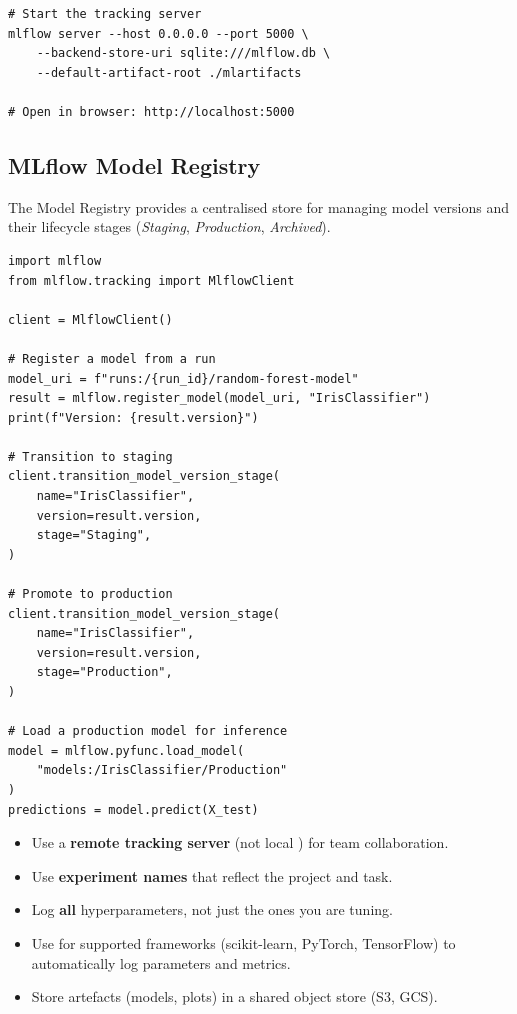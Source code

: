 \begin{codeblock}[title=\textbf{Launching the MLflow UI}]
\begin{verbatim}
# Start the tracking server
mlflow server --host 0.0.0.0 --port 5000 \
    --backend-store-uri sqlite:///mlflow.db \
    --default-artifact-root ./mlartifacts

# Open in browser: http://localhost:5000
\end{verbatim}
\end{codeblock}

\subsection{MLflow Model Registry}

The Model Registry provides a centralised store for managing model versions
and their lifecycle stages (\emph{Staging}, \emph{Production},
\emph{Archived}).

\begin{codeblock}[title=\textbf{MLflow Model Registry workflow}]
\begin{verbatim}
import mlflow
from mlflow.tracking import MlflowClient

client = MlflowClient()

# Register a model from a run
model_uri = f"runs:/{run_id}/random-forest-model"
result = mlflow.register_model(model_uri, "IrisClassifier")
print(f"Version: {result.version}")

# Transition to staging
client.transition_model_version_stage(
    name="IrisClassifier",
    version=result.version,
    stage="Staging",
)

# Promote to production
client.transition_model_version_stage(
    name="IrisClassifier",
    version=result.version,
    stage="Production",
)

# Load a production model for inference
model = mlflow.pyfunc.load_model(
    "models:/IrisClassifier/Production"
)
predictions = model.predict(X_test)
\end{verbatim}
\end{codeblock}

\begin{bestpractice}[title=\textbf{MLflow best practices}]
\begin{itemize}
  \item Use a \textbf{remote tracking server} (not local )
    for team collaboration.
  \item Use \textbf{experiment names} that reflect the project and task.
  \item Log \textbf{all} hyperparameters, not just the ones you are tuning.
  \item Use \cli{mlflow.autolog()} for supported frameworks (scikit-learn,
    PyTorch, TensorFlow) to automatically log parameters and metrics.
  \item Store artefacts (models, plots) in a shared object store (S3, GCS).
\end{itemize}
\end{bestpractice}

